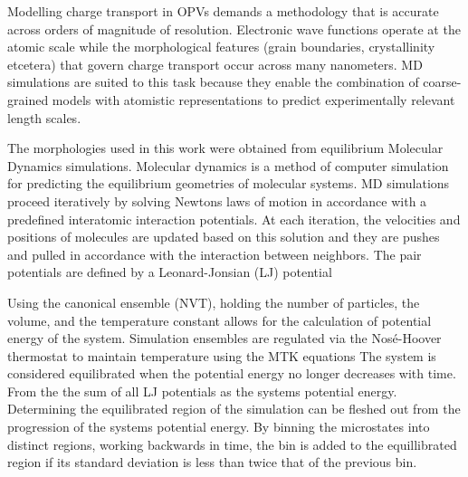 
Modelling charge transport in OPVs demands a methodology that is accurate across orders of magnitude of
resolution. Electronic wave functions operate at the atomic scale while the morphological features (grain
boundaries, crystallinity etcetera) that govern charge transport occur across many nanometers. MD simulations
are suited to this task because they enable the combination of coarse-grained models with atomistic
representations to predict experimentally relevant length scales. 

The morphologies used in this work  were obtained from equilibrium Molecular Dynamics simulations. 
Molecular dynamics is a method of computer simulation for predicting the equilibrium geometries of molecular
systems. MD simulations proceed iteratively by solving Newtons laws of motion
in accordance with a predefined interatomic interaction potentials.
At each iteration, the velocities and positions of molecules are
updated based on this solution and they are pushes and pulled in accordance with
the interaction between neighbors. The pair potentials are defined by a Leonard-Jonsian (LJ) potential \cite{Jones1924a}

Using the canonical ensemble (NVT), holding the number of
particles, the volume, and the temperature constant allows for the calculation of 
potential energy of the system.  
Simulation ensembles are regulated via the Nos\'{e}-Hoover thermostat \cite{Hoover1985} to maintain 
temperature using the MTK equations \cite{Martyna1994d}\cite{Cao1996}
The system is considered equilibrated when the potential energy no longer decreases with time. 
From the the sum of all LJ potentials as the systems potential energy. Determining the equilibrated region of the
simulation can be fleshed out from the progression of the systems potential energy. By binning the microstates
into distinct regions, working backwards in time, the bin is added to the equillibrated region if its standard
deviation is less than twice that of the previous bin. \cite{Henry2017a}

